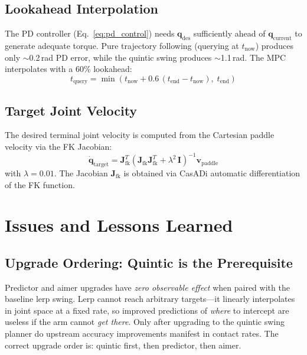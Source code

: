 \documentclass[11pt,letterpaper]{article}
\newcommand{\vv}[1]{\mathbf{#1}}
\begin{document}
\subsection{Lookahead Interpolation}

The PD controller (Eq.~\ref{eq:pd_control}) needs $\vv{q}_{\text{des}}$ sufficiently ahead of $\vv{q}_{\text{current}}$ to generate adequate torque.  Pure trajectory following (querying at $t_{\text{now}}$) produces only $\sim$0.2\,rad PD error, while the quintic swing produces $\sim$1.1\,rad.  The MPC interpolates with a 60\% lookahead:
\begin{equation}
    t_{\text{query}} = \min\!\left(t_{\text{now}} + 0.6\,(t_{\text{end}} - t_{\text{now}}),\; t_{\text{end}}\right)
\end{equation}

\subsection{Target Joint Velocity}

The desired terminal joint velocity is computed from the Cartesian paddle velocity via the FK Jacobian:
\begin{equation}
    \dot{\vv{q}}_{\text{target}} = \vv{J}_{\text{fk}}^T\!\left(\vv{J}_{\text{fk}}\vv{J}_{\text{fk}}^T + \lambda^2\,\vv{I}\right)^{-1}\vv{v}_{\text{paddle}}
\end{equation}
with $\lambda = 0.01$.  The Jacobian $\vv{J}_{\text{fk}}$ is obtained via CasADi automatic differentiation of the FK function.

\section{Issues and Lessons Learned}
\label{sec:lessons}

\subsection{Upgrade Ordering: Quintic is the Prerequisite}

Predictor and aimer upgrades have \emph{zero observable effect} when paired with the baseline lerp swing.  Lerp cannot reach arbitrary targets---it linearly interpolates in joint space at a fixed rate, so improved predictions of \emph{where} to intercept are useless if the arm cannot \emph{get there}.  Only after upgrading to the quintic swing planner do upstream accuracy improvements manifest in contact rates.  The correct upgrade order is: quintic first, then predictor, then aimer.
\end{document}
